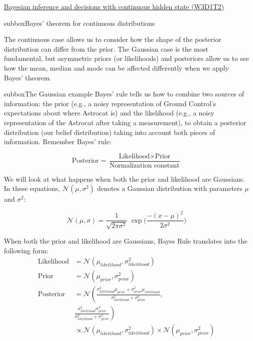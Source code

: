 \begin{textbox}{\href{https://compneuro.neuromatch.io/tutorials/W3D1_BayesianDecisions/student/W3D1_Tutorial2.html}{Bayesian inference and decisions with continuous hidden state (W3D1T2)} }
\begin{subbox}{subbox}{Bayes' theorem for continuous distributions}
\scriptsize

The continuous case allows us to consider how the shape of the posterior distribution can differ from the prior. The Gaussian case is the most fundamental, but asymmetric priors (or likelihoods) and posteriors allow us to see how the mean, median and mode can be affected differently when we apply Bayes' theorem.

\end{subbox}
\begin{subbox}{subbox}{The Gaussian example}
\scriptsize
Bayes' rule tells us how to combine two sources of information: the prior (e.g., a noisy representation of Ground Control's expectations about where Astrocat is) and the likelihood (e.g., a noisy representation of the Astrocat after taking a measurement), to obtain a posterior distribution (our belief distribution) taking into account both pieces of information. Remember Bayes' rule:

\begin{equation}
\text{Posterior} = \frac{ \text{Likelihood} \times \text{Prior}}{ \text{Normalization constant}}
\end{equation}

We will look at what happens when both the prior and likelihood are Gaussians. In these equations, $\mathcal{N}(\mu,\sigma^2)$ denotes a Gaussian distribution with parameters $\mu$ and $\sigma^2$:

\begin{equation}
\mathcal{N}(\mu, \sigma) = \frac{1}{\sqrt{2 \pi \sigma^2}} \; \exp \bigg( \frac{-(x-\mu)^2}{2\sigma^2} \bigg)
\end{equation}

When both the prior and likelihood are Gaussians, Bayes Rule translates into the following form:
\tiny
\begin{align*}
\text{Likelihood} &= \mathcal{N}(\mu_{likelihood},\sigma_{likelihood}^2) \\
\text{Prior} &= \mathcal{N}(\mu_{prior},\sigma_{prior}^2) \\
\text{Posterior} &= \mathcal{N}\left( \frac{\sigma^2_{likelihood}\mu_{prior}+\sigma^2_{prior}\mu_{likelihood}}{\sigma^2_{likelihood}+\sigma^2_{prior}},\right.\\
& \left. \frac{\sigma^2_{likelihood}\sigma^2_{prior}}{\sigma^2_{likelihood}+\sigma^2_{prior}} \right) \\
&\propto \mathcal{N}(\mu_{likelihood},\sigma_{likelihood}^2) \times \mathcal{N}(\mu_{prior},\sigma_{prior}^2)
\end{align*}



\end{subbox}
\end{textbox}
